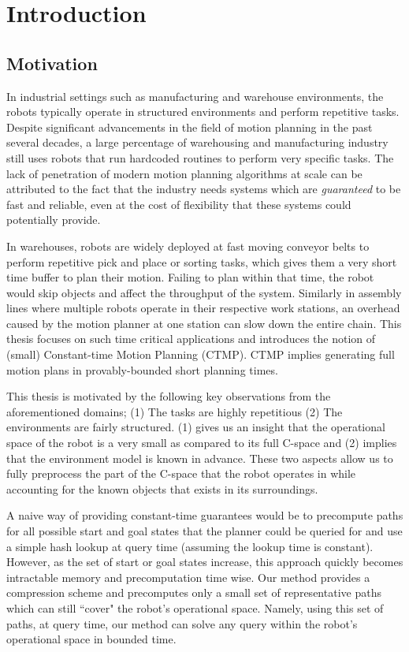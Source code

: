 \documentclass[a4paper,10pt]{article}
\begin{document}
\tableofcontents
\newpage

\section{Introduction}
\subsection{Motivation}
In industrial settings such as manufacturing and warehouse environments, the robots typically operate in structured environments and perform repetitive tasks. Despite significant advancements in the field of motion planning in the past several decades, a large percentage of warehousing and manufacturing industry still uses robots that run hardcoded routines to perform very specific tasks. The lack of penetration of modern motion planning algorithms at scale can be attributed to the fact that the industry needs systems which are \emph{guaranteed} to be fast and reliable, even at the cost of flexibility that these systems could potentially provide.

In warehouses, robots are widely deployed at fast moving conveyor belts to perform repetitive pick and place or sorting tasks, which gives them a very short time buffer to plan their motion. Failing to plan within that time, the robot would skip objects and affect the throughput of the system. Similarly in assembly lines where multiple robots operate in their respective work stations, an overhead caused by the motion planner at one station can slow down the entire chain. This thesis focuses on such time critical applications and introduces the notion of (small) Constant-time Motion Planning (CTMP). CTMP implies generating full motion plans in provably-bounded short planning times.

This thesis is motivated by the following key observations from the aforementioned domains; (1) The tasks are highly repetitious (2) The  environments are fairly structured. (1) gives us an insight that the operational space of the robot is a very small as compared to its full C-space and (2) implies that the environment model is known in advance. These two aspects allow us to fully preprocess the part of the C-space that the robot operates in while accounting for the known objects that exists in its surroundings.

A naive way of providing constant-time guarantees would be to precompute paths for all possible start and goal states that the planner could be queried for and use a simple hash lookup at query time (assuming the lookup time is constant). However, as the set of start or goal states increase, this approach quickly becomes intractable memory and precomputation time wise. Our method provides a compression scheme and precomputes only a small set of representative paths which can still ``cover" the robot's operational space. Namely, using this set of paths, at query time, our method can solve any query within the robot's operational space in bounded time.
\end{document}
